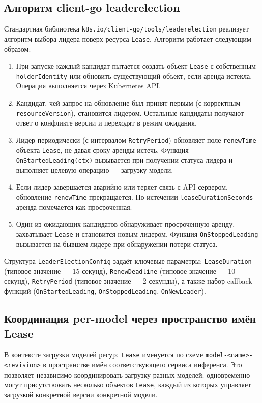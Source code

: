 \subsection*{Алгоритм client-go leaderelection}

Стандартная библиотека \texttt{k8s.io/client-go/tools/leaderelection} реализует алгоритм выбора лидера поверх ресурса \texttt{Lease}. Алгоритм работает следующим образом:

\begin{enumerate}[leftmargin=*]
  \item При запуске каждый кандидат пытается создать объект \texttt{Lease} с собственным \texttt{holderIdentity} или обновить существующий объект, если аренда истекла. Операция выполняется через Kubernetes API.
  \item Кандидат, чей запрос на обновление был принят первым (с корректным \texttt{resourceVersion}), становится лидером. Остальные кандидаты получают ответ о конфликте версии и переходят в режим ожидания.
  \item Лидер периодически (с интервалом \texttt{RetryPeriod}) обновляет поле \texttt{renewTime} объекта \texttt{Lease}, не давая сроку аренды истечь. Функция \texttt{OnStartedLeading(ctx)} вызывается при получении статуса лидера и выполняет целевую операцию --- загрузку модели.
  \item Если лидер завершается аварийно или теряет связь с API-сервером, обновление \texttt{renewTime} прекращается. По истечении \texttt{leaseDurationSeconds} аренда помечается как просроченная.
  \item Один из ожидающих кандидатов обнаруживает просроченную аренду, захватывает \texttt{Lease} и становится новым лидером. Функция \texttt{OnStoppedLeading} вызывается на бывшем лидере при обнаружении потери статуса.
\end{enumerate}

Структура \texttt{LeaderElectionConfig} задаёт ключевые параметры: \texttt{LeaseDuration} (типовое значение --- 15 секунд), \texttt{RenewDeadline} (типовое значение --- 10 секунд), \texttt{RetryPeriod} (типовое значение --- 2 секунды), а также набор callback-функций (\texttt{OnStartedLeading}, \texttt{OnStoppedLeading}, \texttt{OnNewLeader}).

\subsection*{Координация per-model через пространство имён Lease}

В контексте загрузки моделей ресурс \texttt{Lease} именуется по схеме \texttt{model-<name>-<revision>} в пространстве имён соответствующего сервиса инференса. Это позволяет независимо координировать загрузку разных моделей: одновременно могут присутствовать несколько объектов \texttt{Lease}, каждый из которых управляет загрузкой конкретной версии конкретной модели.

